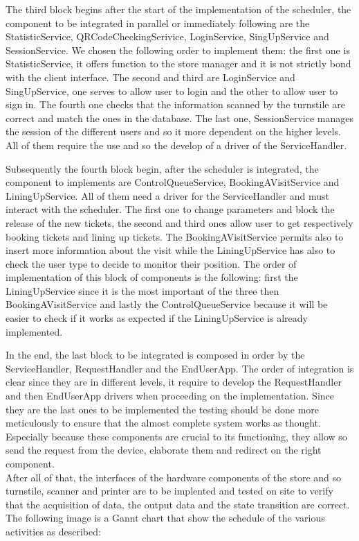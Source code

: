 The third block begins after the start of the implementation of the scheduler, the component to be integrated in parallel or immediately following are the StatisticService, QRCodeCheckingSerivice, LoginService, SingUpService and SessionService.
We chosen the following order to implement them:
the first one is StatisticService, it offers function to the store manager and it is not strictly bond with the client interface. The second and third are LoginService and SingUpService, one serves to allow user to login and the other to allow user to sign in. The fourth one checks that the information scanned by the turnstile are correct and match the ones in the database. The last one, SessionService manages the session of the different users and so it more dependent on the higher levels. All of them require the use and so the develop of a driver of the ServiceHandler.

Subsequently the fourth block begin, after the scheduler is integrated, the component to implements are ControlQueueService, BookingAVisitService and LiningUpService. All of them need a driver for the ServiceHandler and must interact with the scheduler. The first one to change parameters and block the release of the new tickets, the second and third ones allow user to get respectively booking tickets and lining up tickets. The BookingAVisitService permits also to insert more information about the visit while the LiningUpService has also to check the user type to decide to monitor their position. The order of implementation of this block of components is the following: first the LiningUpService since it is the most important of the three then BookingAVisitService and lastly the ControlQueueService because it will be easier to check if it works as expected if the LiningUpService is already implemented.

In the end, the last block to be integrated is composed in order by the ServiceHandler, RequestHandler and the EndUserApp. The order of integration is clear since they are in different levels, it require to develop the RequestHandler and then EndUserApp drivers when proceeding on the implementation. 
Since they are the last ones to be implemented the testing should be done more meticulously to ensure that the almost complete system works as thought. Especially because these components are crucial to its functioning, they allow so send the request from the device, elaborate them and redirect on the right component.\\
After all of that, the interfaces of the hardware components of the store and so turnstile, scanner and printer are to be implented and tested on site to verify that the acquisition of data, the output data and the state transition are correct. \\
The following image is a Gannt chart that show the schedule of the various activities as described:

